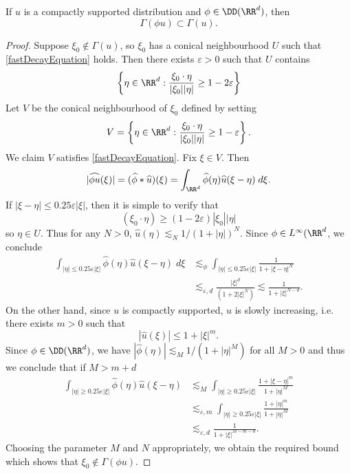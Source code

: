 \begin{lemma} \label{wavefrontlocalizationlemma}
  If $u$ is a compactly supported distribution and $\phi \in \DD(\RR^d)$, then
  \[ \Gamma(\phi u) \subset \Gamma(u). \]
\end{lemma}
\begin{proof}
  Suppose $\xi_0 \not \in \Gamma(u)$, so $\xi_0$ has a conical neighbourhood $U$ such that \eqref{fastDecayEquation} holds. Then there exists $\varepsilon > 0$ such that $U$ contains
  \[ \left\{ \eta \in \RR^d : \frac{\xi_0 \cdot \eta}{|\xi_0| |\eta|} \geq 1 - 2\varepsilon \right\} \]
  Let $V$ be the conical neighbourhood of $\xi_0$ defined by setting
  \[ V = \left\{ \eta \in \RR^d : \frac{\xi_0 \cdot \eta}{|\xi_0| |\eta|} \geq 1 - \varepsilon \right\}. \]
  We claim $V$ satisfies \eqref{fastDecayEquation}. Fix $\xi \in V$. Then
  \[ |\widehat{\phi u}(\xi)| = (\widehat{\phi} * \widehat{u})(\xi) = \int_{\RR^d} \widehat{\phi}(\eta) \widehat{u}(\xi - \eta)\; d\xi. \]
  If $|\xi - \eta| \leq 0.25 \varepsilon |\xi|$, then it is simple to verify that
  \[ (\xi_0 \cdot \eta) \geq (1 - 2\varepsilon) |\xi_0| |\eta| \]
  so $\eta \in U$. Thus for any $N > 0$, $\widehat{u}(\eta) \lesssim_N 1/(1 + |\eta|)^N$. Since $\phi \in L^\infty(\RR^d$, we conclude
  \begin{align*}
    \int_{|\eta| \leq 0.25 \varepsilon |\xi|} \widehat{\phi}(\eta) \widehat{u}(\xi - \eta)\; d\xi &\lesssim_{\phi} \int_{|\eta| \leq 0.25 \varepsilon |\xi|} \frac{1}{1 + |\xi - \eta|^N}\\
    &\lesssim_{\varepsilon,d} \frac{|\xi|^d}{(1 + 2 |\xi|^{N})} \lesssim \frac{1}{1 + |\xi|^{N-d}}.
  \end{align*}
  On the other hand, since $u$ is compactly supported, $\widehat{u}$ is slowly increasing, i.e. there exists $m > 0$ such that
  \[ |\widehat{u}(\xi)| \leq 1 + |\xi|^m. \]
  Since $\phi \in \DD(\RR^d)$, we have $|\widehat{\phi}(\eta)| \lesssim_M 1/(1 + |\eta|^M)$ for all $M > 0$ and thus we conclude that if $M > m + d$
  \begin{align*}
    \int_{|\eta| \geq 0.25 \varepsilon |\xi|} \widehat{\phi}(\eta) \widehat{u}(\xi - \eta) &\lesssim_M \int_{|\eta| \geq 0.25 \varepsilon |\xi|} \frac{1 + |\xi - \eta|^m}{1 + |\eta|^M}\\
    &\lesssim_{\varepsilon,m} \int_{|\eta| \geq 0.25 \varepsilon |\xi|} \frac{1 + |\eta|^m}{1 + |\eta|^M}\\
    &\lesssim_{\varepsilon,d} \frac{1}{1 + |\xi|^{M-m-d}}.
  \end{align*}
  Choosing the parameter $M$ and $N$ appropriately, we obtain the required bound which shows that $\xi_0 \not \in \Gamma(\phi u)$.
\end{proof}


